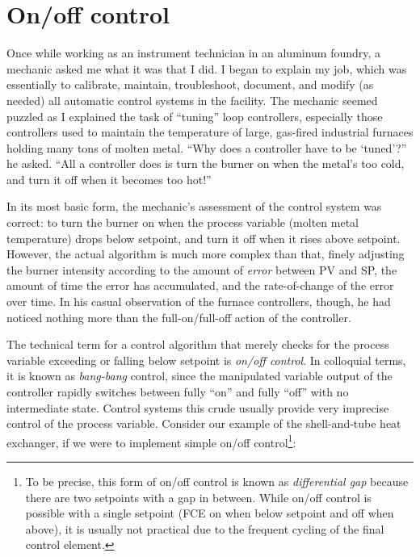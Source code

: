 \filbreak
\section{On/off control}

Once while working as an instrument technician in an aluminum foundry, a mechanic asked me what it was that I did.  I began to explain my job, which was essentially to calibrate, maintain, troubleshoot, document, and modify (as needed) all automatic control systems in the facility.  The mechanic seemed puzzled as I explained the task of ``tuning'' loop controllers, especially those controllers used to maintain the temperature of large, gas-fired industrial furnaces holding many tons of molten metal.  ``Why does a controller have to be `tuned'?'' he asked.  ``All a controller does is turn the burner on when the metal's too cold, and turn it off when it becomes too hot!''

In its most basic form, the mechanic's assessment of the control system was correct: to turn the burner on when the process variable (molten metal temperature) drops below setpoint, and turn it off when it rises above setpoint.  However, the actual algorithm is much more complex than that, finely adjusting the burner intensity according to the amount of \textit{error} between PV and SP, the amount of time the error has accumulated, and the rate-of-change of the error over time.  In his casual observation of the furnace controllers, though, he had noticed nothing more than the full-on/full-off action of the controller.

The technical term for a control algorithm that merely checks for the process variable exceeding or falling below setpoint is \textit{on/off control}.  In colloquial terms, it is known as \textit{bang-bang} control, since the manipulated variable output of the controller rapidly switches between fully ``on'' and fully ``off'' with no intermediate state.  Control systems this crude usually provide very imprecise control of the process variable.  Consider our example of the shell-and-tube heat exchanger, if we were to implement simple on/off control\footnote{To be precise, this form of on/off control is known as \textit{differential gap} because there are two setpoints with a gap in between.  While on/off control is possible with a single setpoint (FCE on when below setpoint and off when above), it is usually not practical due to the frequent cycling of the final control element.}:  


